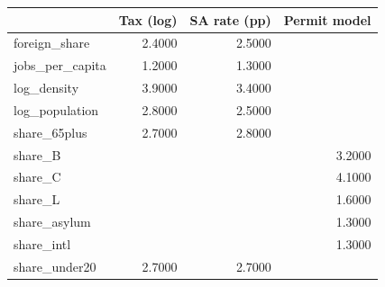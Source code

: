 \begin{tabular}{lrrr}
\toprule
 & Tax (log) & SA rate (pp) & Permit model \\
\midrule
foreign\_share & 2.4000 & 2.5000 &  \\
jobs\_per\_capita & 1.2000 & 1.3000 &  \\
log\_density & 3.9000 & 3.4000 &  \\
log\_population & 2.8000 & 2.5000 &  \\
share\_65plus & 2.7000 & 2.8000 &  \\
share\_B &  &  & 3.2000 \\
share\_C &  &  & 4.1000 \\
share\_L &  &  & 1.6000 \\
share\_asylum &  &  & 1.3000 \\
share\_intl &  &  & 1.3000 \\
share\_under20 & 2.7000 & 2.7000 &  \\
\bottomrule
\end{tabular}
